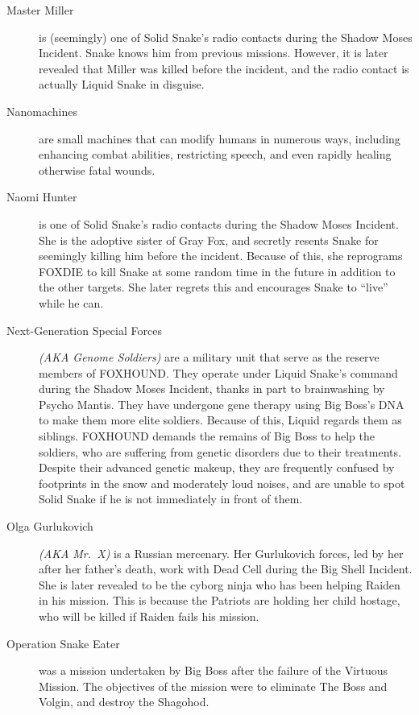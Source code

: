 \documentclass[12pt]{article}
\begin{document}
\begin{description}
	\item [Master Miller] is (seemingly) one of Solid Snake's radio
		contacts during the Shadow Moses Incident. Snake knows him from
		previous missions. However, it is later revealed that Miller
		was killed before the incident, and the radio contact is
		actually Liquid Snake in disguise.

	\item [Nanomachines] are small machines that can modify humans in
		numerous ways, including enhancing combat abilities,
		restricting speech, and even rapidly healing otherwise fatal
		wounds.
	
	\item [Naomi Hunter] is one of Solid Snake's radio contacts during the
		Shadow Moses Incident. She is the adoptive sister of Gray Fox,
		and secretly resents Snake for seemingly killing him before the
		incident. Because of this, she reprograms FOXDIE to kill Snake
		at some random time in the future in addition to the other
		targets. She later regrets this and encourages Snake to
		``live'' while he can.

	\item [Next-Generation Special Forces] \textit{(AKA Genome Soldiers)}
		are a military unit that serve as the reserve members of
		FOXHOUND. They operate under Liquid Snake's command during the
		Shadow Moses Incident, thanks in part to brainwashing by Psycho
		Mantis. They have undergone gene therapy using Big Boss's DNA
		to make them more elite soldiers. Because of this, Liquid
		regards them as siblings. FOXHOUND demands the remains of Big
		Boss to help the soldiers, who are suffering from genetic
		disorders due to their treatments. Despite their advanced
		genetic makeup, they are frequently confused by footprints in
		the snow and moderately loud noises, and are unable to spot
		Solid Snake if he is not immediately in front of them.
	
	\item [Olga Gurlukovich] \textit{(AKA Mr.\ X)} is a Russian mercenary.
		Her Gurlukovich forces, led by her after her father's death,
		work with Dead Cell during the Big Shell Incident. She is later
		revealed to be the cyborg ninja who has been helping Raiden in
		his mission. This is because the Patriots are holding her child
		hostage, who will be killed if Raiden fails his mission.

	\item [Operation Snake Eater] was a mission undertaken by Big Boss
		after the failure of the Virtuous Mission. The objectives of
		the mission were to eliminate The Boss and Volgin, and destroy
		the Shagohod.


\end{description}
\end{document}
